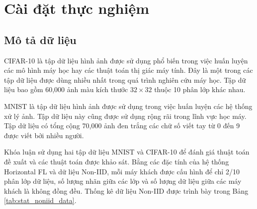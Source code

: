 \chapter{Cài đặt thực nghiệm}
\label{Chapter4}

\section{Mô tả dữ liệu}

CIFAR-10 \cite{cifar-10} là tập dữ liệu hình ảnh được sử dụng phổ biến trong việc huấn luyện các mô hình máy học hay các thuật toán thị giác máy tính. Đây là một trong các tập dữ liệu được dùng nhiều nhất trong quá trình nghiên cứu máy học. Tập dữ liệu bao gồm 60,000 ảnh màu kích thước $32\times 32$ thuộc 10 phân lớp khác nhau.

MNIST \cite{mnist} là tập dữ liệu hình ảnh được sử dụng trong việc huấn luyện các hệ thống xử lý ảnh. Tập dữ liệu này cũng được sử dụng rộng rãi trong lĩnh vực học máy. Tập dữ liệu có tổng cộng 70,000 ảnh đen trắng các chữ số viết tay từ 0 đến 9 được viết bởi nhiều người.

Khóa luận sử dụng hai tập dữ liệu MNIST và CIFAR-10 để đánh giá thuật toán đề xuất và các thuật toán được khảo sát. Bằng các đặc tính của hệ thống Horizontal FL và dữ liệu Non-IID, mỗi máy khách được cấu hình để chỉ 2/10 phân lớp dữ liệu, số lượng nhãn giữa các lớp và số lượng dữ liệu giữa các máy khách là không đồng đều. Thống kê dữ liệu Non-IID được trình bày trong Bảng \ref{tab:stat_noniid_data}.

\begin{table}[H]
    \caption{Thống kê trên hai tập dữ liệu MNIST và CIFAR-10 (dữ liệu Non-IID)}
    \label{tab:stat_noniid_data}
\end{table}

